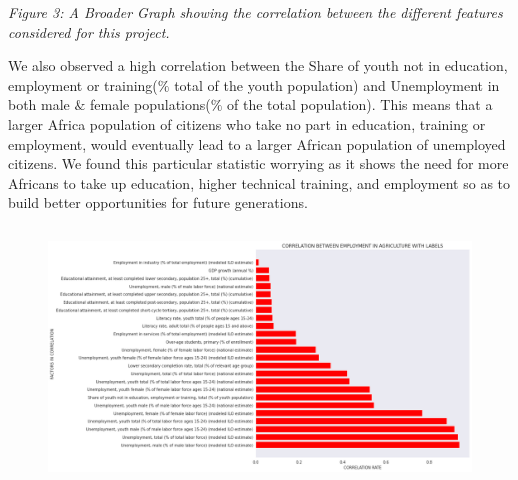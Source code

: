 \documentclass[12pt]{article}
\renewcommand{\_}{\kern-1.5pt\textunderscore\kern-1.5pt}
\begin{document}


\vspace{\baselineskip}\begin{justify}
{\fontsize{8pt}{9.6pt}\selectfont \textit{Figure 3: A Broader Graph showing the correlation between the different features considered for this project.}\par}
\end{justify}

\vspace{\baselineskip}

\vspace{\baselineskip}
\begin{justify}
{\fontsize{9pt}{10.8pt}\selectfont We also observed a high correlation between the Share of youth not in education, employment or training($\%$  total of the youth population) and Unemployment in both male $\&$  female populations($\%$  of the total population). This means that a larger Africa population of citizens who take no part in education, training or employment, would eventually lead to a larger African population of unemployed citizens. We found this particular statistic worrying as it shows the need for more Africans to take up education, higher technical training, and employment so as to build better opportunities for future generations.\par}
\end{justify}

\vspace{\baselineskip}

\vspace{\baselineskip}



\begin{figure}[H]
	\begin{Center}
		\includegraphics[width=6.47in,height=2.7in]{./media/image2.png}
	\end{Center}
\end{figure}
\end{document}
